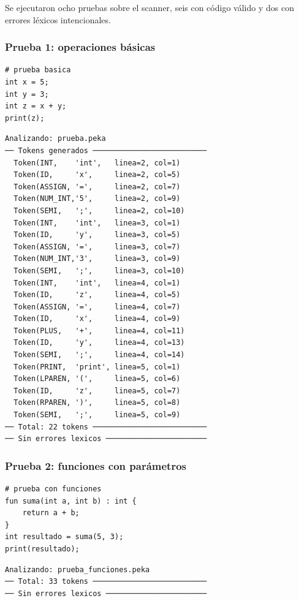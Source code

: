 \documentclass[12pt]{article}
\begin{document}
Se ejecutaron ocho pruebas sobre el scanner, seis con código válido y
dos con errores léxicos intencionales.

\subsubsection{Prueba 1: operaciones básicas}

\begin{lstlisting}[caption={prueba.peka}]
# prueba basica
int x = 5;
int y = 3;
int z = x + y;
print(z);
\end{lstlisting}

\begin{lstlisting}[caption={Salida — prueba.peka}]
Analizando: prueba.peka
── Tokens generados ──────────────────────────
  Token(INT,    'int',   linea=2, col=1)
  Token(ID,     'x',     linea=2, col=5)
  Token(ASSIGN, '=',     linea=2, col=7)
  Token(NUM_INT,'5',     linea=2, col=9)
  Token(SEMI,   ';',     linea=2, col=10)
  Token(INT,    'int',   linea=3, col=1)
  Token(ID,     'y',     linea=3, col=5)
  Token(ASSIGN, '=',     linea=3, col=7)
  Token(NUM_INT,'3',     linea=3, col=9)
  Token(SEMI,   ';',     linea=3, col=10)
  Token(INT,    'int',   linea=4, col=1)
  Token(ID,     'z',     linea=4, col=5)
  Token(ASSIGN, '=',     linea=4, col=7)
  Token(ID,     'x',     linea=4, col=9)
  Token(PLUS,   '+',     linea=4, col=11)
  Token(ID,     'y',     linea=4, col=13)
  Token(SEMI,   ';',     linea=4, col=14)
  Token(PRINT,  'print', linea=5, col=1)
  Token(LPAREN, '(',     linea=5, col=6)
  Token(ID,     'z',     linea=5, col=7)
  Token(RPAREN, ')',     linea=5, col=8)
  Token(SEMI,   ';',     linea=5, col=9)
── Total: 22 tokens ──────────────────────────
── Sin errores lexicos ───────────────────────
\end{lstlisting}

\newpage
\subsubsection{Prueba 2: funciones con parámetros}

\begin{lstlisting}[caption={prueba\_funciones.peka}]
# prueba con funciones
fun suma(int a, int b) : int {
    return a + b;
}
int resultado = suma(5, 3);
print(resultado);
\end{lstlisting}

\begin{lstlisting}[caption={Salida — prueba\_funciones.peka}]
Analizando: prueba_funciones.peka
── Total: 33 tokens ──────────────────────────
── Sin errores lexicos ───────────────────────
\end{lstlisting}
\end{document}
